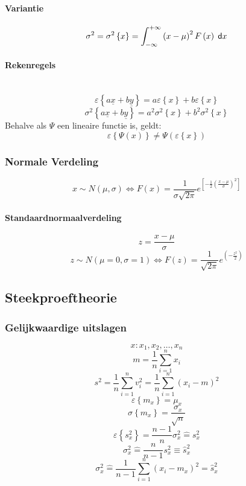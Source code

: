       \paragraph{Variantie}
        \[
          \sigma^2 = \sigma^2\left\{x\right\} = \int_{- \infty}^{+ \infty} \left(x-\mu\right)^2 F\left(x\right) \;\textsf{d}x
        \]
      \paragraph{Rekenregels}\
        \[
          \varepsilon\left\{a\underline{x} + b\underline{y}\right\} = a \varepsilon\left\{x\right\} + b \varepsilon\left\{x\right\}
        \]
        \[
          \sigma^2\left\{a\underline{x} + b\underline{y}\right\} = a^2 \sigma^2\left\{x\right\} + b^2 \sigma^2\left\{x\right\}
        \]
        Behalve als $\Psi$ een lineaire functie is, geldt:
        \[
          \varepsilon \left\{ \Psi\left(x\right) \right\} \neq \Psi\left( \varepsilon\left\{x\right\}\right)
        \]
    \subsubsection{Normale Verdeling}
    \label{sec:NormaleVerdeling}
      \[
        x \sim N\left(\mu,\sigma\right) \Leftrightarrow 
        F\left( x \right) = \frac{1}{\sigma\sqrt{2\pi}} e^{\left[-\frac{1}{2}\left(\frac{x-\mu}{\sigma}\right)^2\right]}
      \]
      
      \paragraph{Standaardnormaalverdeling}
      \label{sec:Standaardnormaalverdeling}
      \[
        z = \frac{x-\mu}{\sigma}
      \]
      \[
        z \sim N\left(\mu=0,\sigma=1\right) \Leftrightarrow
        F\left( z \right) = \frac{1}{\sqrt{2\pi}} e^{\left(-\frac{z^2}{2}\right)}
      \]
  \subsection{Steekproeftheorie}
  \label{sec:Steekproeftheorie}
    \subsubsection{Gelijkwaardige uitslagen}
    \label{sec:SteekproeftheorieGeljkwaardigeUitslagen}
      \[
        x : x_1, x_2, \ldots, x_n
      \]
      \[
        m = \frac{1}{n} \sum^n_{i=1}x_i
      \]
      \[
        s^2 = \frac{1}{n} \sum^n_{i=1}v_i^2 = \frac{1}{n} \sum^n_{i=1}\left(x_i-m\right)^2
      \]
      \[
        \varepsilon\left\{ m_x\right\} = \mu_x
      \]
      \[
        \sigma\left\{ m_x\right\} = \frac{\sigma_x}{\sqrt{n}}
      \]
      \[
        \varepsilon\left\{s_x^2\right\} = \frac{n-1}{n}\sigma_x^2 \hat{=} s_x^2
      \]
      \[
        \sigma^2_x \hat{=} \frac{n}{n-1}s_x^2 \equiv \hat{s}^2_x
      \]
      \[
        \sigma_x^2 \hat{=} \frac{1}{n-1}\sum^n_{i=1} \left(x_i-m_x\right)^2 = \hat{s}^2_x
      \]
